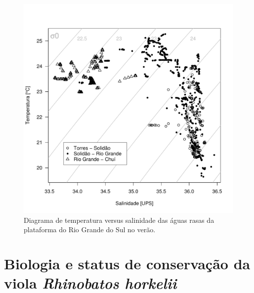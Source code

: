 \documentclass[a4paper,11pt,twoside,showtrims,onecolumn,openright,final]{memoir}
\begin{document}
%

\begin{figure}
\begin{center}
\includegraphics[width=\textwidth]{DIAGRAMATS}
\end{center}
\caption[Diagrama de temperatura versus salinidade das águas rasas da plataforma do Rio Grande do Sul no verão]
	{Diagrama de temperatura versus salinidade das águas rasas da plataforma do Rio Grande do Sul no verão.}
\label{fig:diagrama-ts}
\end{figure}



\chapter[Biologia e status de conservação da viola  \emph{Rhinobatos horkelii}]
        {Biologia e status de conservação da viola  \emph{Rhinobatos horkelii}}\label{chap:viola}


\end{document}
